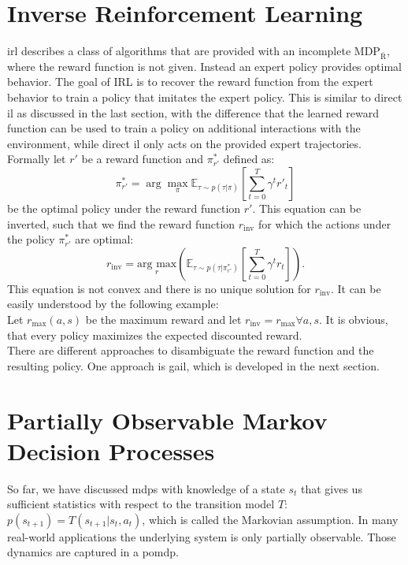 \section{Inverse Reinforcement Learning}
\ac{irl} describes a class of algorithms that are provided with an incomplete $\text{MDP}_{\bar{\text{R}}}$, 
where the reward function is not given. Instead an expert policy provides optimal behavior. The goal of IRL is to recover the reward function from the 
expert behavior to train a policy that imitates the expert policy. This is similar to direct \ac{il} as discussed in the last section, 
with the difference that the learned reward 
function can be used to train a policy on additional interactions with the environment, 
while direct \ac{il} only acts on the provided expert trajectories. 
Formally let $r'$ be a reward function and $\pi_{r'}^*$ defined as:
\begin{equation}
    \pi_{r'}^* = \arg\max_{\pi} \mathbb{E}_{\tau \sim p(\tau | \pi)} \left[ \sum_{t=0}^T \gamma^t r'_t \right]
\end{equation}
be the optimal policy under the reward function $r'$. This equation can be inverted, such that we find the reward function $r_{\mathrm{inv}}$ for which the 
actions under the policy $\pi_{r'}^*$ are optimal:
\begin{equation}
    r_{\text{inv}} = \underset{r}{\text{arg max}} \left( \mathbb{E}_{\tau \sim p(\tau | \pi_{r'}^*)} \left[ \sum_{t=0}^T \gamma^t r_t \right] \right).
\end{equation}
This equation is not convex and there is no unique solution for $r_{\text{inv}}$. It can be easily understood by the following example: \\
Let $r_{\max}(a,s)$ be the maximum reward and let $r_{\text{inv}} = r_{\max} \forall a,s$. It is obvious, that every policy maximizes the expected discounted reward.\\
There are different approaches to disambiguate the reward function and the resulting policy. One approach is \ac{gail}, 
which is developed in the next section.


\section{Partially Observable Markov Decision Processes}
\label{POMDP}
So far, we have discussed \ac{mdp}s with knowledge of a state $s_t$ that gives us sufficient statistics with respect to the 
transition model $T$: $p(s_{t+1}) = T(s_{t+1}|s_t, a_t)$, which is called the Markovian assumption. In many real-world applications the underlying system 
is only partially observable. Those dynamics are captured in a \ac{pomdp}.

